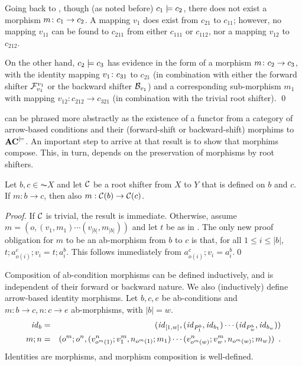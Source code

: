 \begin{example}
Going back to , though (as noted before) $c_1\models c_2$, there does not exist a morphism $m\colon c_1\rightarrow c_2$. A mapping $v_1$ does exist from $c_{21}$ to $c_{11}$; however, no mapping $v_{11}$ can be found to $c_{211}$ from either $c_{111}$ or $c_{112}$, nor a mapping $v_{12}$ to $c_{212}$.

On the other hand, $c_2\models c_3$ has evidence in the form of a morphism $m\colon c_2\rightarrow c_3$, with the identity mapping $v_1\colon c_{31}$ to $c_{21}$ (in combination with either the forward shifter $\mathcal{F}_{v_1}^{v_1}$ or the backward shifter $\mathcal{B}_{v_1}$) and a corresponding sub-morphism $m_1$ with mapping $v_{12}:c_{212}\to c_{321}$ (in combination with the trivial root shifter).
\qed
\end{example}
%
 can be phrased more abstractly as the existence of a functor from a category of arrow-based conditions and their (forward-shift or backward-shift) morphims to $\mathbf{AC}^{\models}$. An important step to arrive at that result is to show that morphims compose. This, in turn, depends on the preservation of morphisms by root shifters.

\begin{lemma}
Let $b,c \in  \AC{X}$ and let $\mathcal{C}$ be a root shifter from $X$ to $Y$ that is defined on $b$ and $c$. If $m:b\to c$, then also $m:\mathcal{C}(b)\rightarrow\mathcal{C}(c)$. 
\end{lemma}
%
\begin{fullorname}
\begin{proof}
If $\mathcal{C}$ is trivial, the result is immediate. Otherwise, assume $m = (o,(v_1,m_1)\cdots(v_{|b|},m_{|b|}))$ and let $t$ be as in . The only new proof obligation for $m$ to be an ab-morphism from $b$ to $c$ is that, for all $1\leq i\leq |b|$, $t;a^c_{o(i)};v_i=t;a^b_i$. This follows immediately from $a^c_{o(i)};v_i=a^b_i$.\qed
\end{proof}
\end{fullorname}
%
Composition of ab-condition morphisms can be defined inductively, and is independent of their forward or backward nature. We also (inductively) define arrow-based identity morphisms. Let $b,c,e$ be ab-conditions and $m:b\to c,n:c\to e$ ab-morphisms, with $|b|=w$.
%
\begin{eqnarray}
\id_b & =
  & (\id_{[1,w]},(\id_{P^b_1},\id_{b_1})\cdots 
                 (\id_{P^b_w},\id_{b_w}))
  \eqlabel{id-morphism} \\
m;n & =
  & (o^m;o^n,(v^n_{o^m(1)};v^m_1,n_{o^m(1)};m_1)\cdots 
              (v^n_{o^m(w)};v^m_w,n_{o^m(w)};m_w)) \enspace.
 \eqlabel{morphism composition}
\end{eqnarray}
%
Identities are morphisms, and morphism composition is well-defined.

